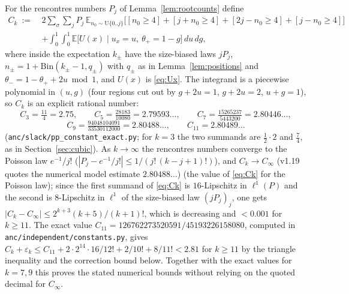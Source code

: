 For the rencontres numbers $P_j$ of Lemma~\ref{lem:rootcounts} define
\begin{equation}\label{eq:Ck}
\begin{aligned}
 C_k\ :=\ &2\sum_\sigma\sum_{j}P_j\,\mathbb E_{n_0\sim\mathrm U\{0..j\}}\bigl[[n_0\ge4]+[j+n_0\ge4]+[2j-n_0\ge4]+[j-n_0\ge4]\bigr]\\
 &+\int_0^1\!\!\int_0^1\mathbb E\bigl[U(x)\mid u_x=u,\ \theta_+=1-g\bigr]\,du\,dg ,
\end{aligned}
\end{equation}
where inside the expectation $k_\pm$ have the size-biased laws $jP_j$, $n_\pm=1+\mathrm{Bin}(k_\pm-1,q_\pm)$ with $q_\pm$ as in
Lemma~\ref{lem:positions} and $\theta_-=1-\theta_++2u\bmod1$, and $U(x)$ is \eqref{eq:Ux}.  The integrand is a piecewise polynomial in $(u,g)$ (four
regions cut out by $g+2u=1$, $g+2u=2$, $u+g=1$), so $C_k$ is an explicit rational number:
\[
 C_3=\tfrac{11}4=2.75,\qquad C_5=\tfrac{28183}{10080}=2.79593\ldots,\qquad C_7=\tfrac{15265237}{5443200}=2.80446\ldots,
\]
\[
 C_9=\tfrac{94048104091}{33530112000}=2.80488\ldots,\qquad C_{11}=2.80489\ldots
\]
(\texttt{anc/slack/pp\_constant\_exact.py}; for $k=3$ the two summands are $\tfrac12\cdot2$ and $\tfrac74$, as in Section~\ref{sec:cubic}).  As
$k\to\infty$ the rencontres numbers converge to the Poisson law $e^{-1}/j!$ ($|P_j-e^{-1}/j!|\le1/(j!\,(k-j+1)!)$), and $C_k\to C_\infty$ (v1.19 quotes the numerical model estimate $2.80488\ldots$)
(the value of \eqref{eq:Ck} for the Poisson law); since the first summand of \eqref{eq:Ck} is $16$-Lipschitz in $\ell^1(P)$ and the second is
$8$-Lipschitz in $\ell^1$ of the size-biased law $(jP_j)_j$, one gets $|C_k-C_\infty|\le2^{k+3}(k+5)/(k+1)!$, which is decreasing and $<0.001$ for $k\ge11$.
The exact value $C_{11}=126762273520591/45193226158080$, computed in \texttt{anc/independent/constants.py}, gives
$C_k+\varepsilon_k\le C_{11}+2\cdot2^{14}\cdot16/12!+2/10!+8/11!<2.81$ for $k\ge11$
by the triangle inequality and the correction bound below.
Together with the exact values for $k=7,9$ this proves the stated numerical bounds without relying on the quoted decimal for $C_\infty$.

